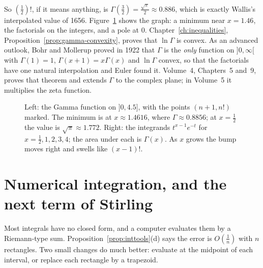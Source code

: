 So $\left(\frac12\right)!$, if it means anything, is $\Gamma\left(\frac32\right)=\frac{\sqrt\pi}2\approx0.886$, which is exactly Wallis's interpolated value of 1656. Figure~\ref{fig:gammafn}
shows the graph: a minimum near $x=1.46$, the factorials on the integers, and a pole at $0$. Chapter~\ref{ch:inequalities}, Proposition~\ref{prop:gamma-convexity}, proves
that $\ln\Gamma$ is convex. As an advanced outlook, Bohr and Mollerup
proved in 1922 that $\Gamma$ is the \emph{only} function on $]0,\infty[$ with $\Gamma(1)=1$, $\Gamma(x+1)=x\Gamma(x)$ and $\ln\Gamma$ convex, so that the
factorials have one natural interpolation and Euler found it. Volume~4, Chapters~5 and~9, proves that theorem and extends $\Gamma$ to the complex plane; in Volume~5 it multiplies
the zeta function.

\begin{figure}[ht]
\centering
{}
\caption{Left: the Gamma function on $]0,4.5]$, with the points $(n+1,n!)$ marked. The minimum is at $x\approx1.4616$, where $\Gamma\approx0.8856$; at $x=\frac12$ the value is $\sqrt\pi\approx1.772$. Right: the integrands $t^{x-1}e^{-t}$ for $x=\frac12,1,2,3,4$; the area under each is $\Gamma(x)$. As $x$ grows the bump moves right and swells like $(x-1)!$.}
\label{fig:gammafn}
\end{figure}

\section{Numerical integration, and the next term of Stirling}

Most integrals have no closed form, and a computer evaluates them by a Riemann-type sum. Proposition~\ref{prop:inttools}(d) says the error is $O\left(\frac1n\right)$
with $n$ rectangles. Two small changes do much better: evaluate at the midpoint of each interval, or replace each rectangle by a trapezoid.

